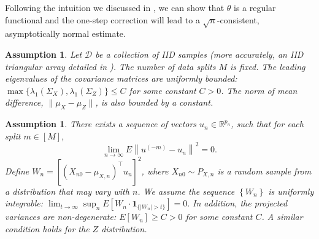\documentclass[11pt]{article}
\newtheorem{assumption}[theorem]{Assumption}
\begin{document}


Following the intuition we discussed in , we can show that $\theta$ is a regular functional and the one-step correction will lead to a $\sqrt{n}$-consistent, asymptotically normal estimate.

\begin{assumption}\label{assumption: basic}
Let $\mathcal{D}$ be a collection of IID samples (more accurately, an IID triangular array detailed in ). The number of data splits $M$ is fixed. The leading eigenvalues of the covariance matrices are uniformly bounded:
$
\max\{\lambda_1\left(\Sigma_X\right), \lambda_1\left(\Sigma_Z\right)\} \leq C
$
for some constant $C>0$. The norm of mean difference, $\|\mu_X - \mu_Z\|$, is also bounded by a constant.
\end{assumption}

\begin{assumption}\label{assumption: degenerate}
There exists a sequence of vectors $u_n\in\mathbb{R}^{p_n}$, such that for each split $m\in[M]$, 
$$
\lim _{n \rightarrow \infty} E\left\|u^{(-m)}-u_n\right\|^2=0.
$$
Define $W_n=\left[\left(X_{n 0}-\mu_{X, n}\right)^{\top} u_n\right]^2$, where $X_{n 0} \sim P_{X, n}$ is a random sample from a distribution that may vary with $n$. We assume the sequence $\left\{W_n\right\}$ is uniformly integrable:
$
\lim _{t \rightarrow \infty} \sup _n E\left[W_n \cdot \mathbf{1}_{\{|W_n|>t\}}\right]=0.
$
In addition, the projected variances are non-degenerate: $E\left[W_n\right] \geq C>0$ for some constant $C$. A similar condition holds for the $Z$ distribution.
\end{assumption}
\end{document}
